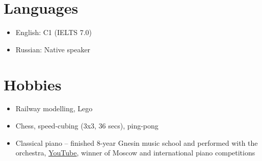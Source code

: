 \documentclass[letterpaper,11pt]{article}
\newcommand{\resumeItemListStart}{\begin{itemize}}
\newcommand{\resumeItemListEnd}{\end{itemize}\vspace{-8pt}}
\newcommand{\resumeItem}[1]{\item\small{{#1 \vspace{-2pt}}}}
\newcommand{\resumeSubItem}[1]{\resumeItem{#1}\vspace{-4pt}}
\begin{document}
\section{Languages}
    \resumeItemListStart
        \resumeSubItem{English: C1 (IELTS 7.0)}
        \resumeSubItem{Russian: Native speaker}
    \resumeItemListEnd


\section{Hobbies}
    \resumeItemListStart
        \resumeSubItem{Railway modelling, Lego}
        \resumeSubItem{Chess, speed-cubing (3x3, 36 secs), ping-pong}
        \resumeSubItem{Classical piano -- finished 8-year Gnesin music school and performed with the orchestra, \href{https://www.youtube.com/user/FeodorKuyanov/playlists}{\underline{YouTube}}, winner of Moscow and international piano competitions}
    \resumeItemListEnd
\end{document}
